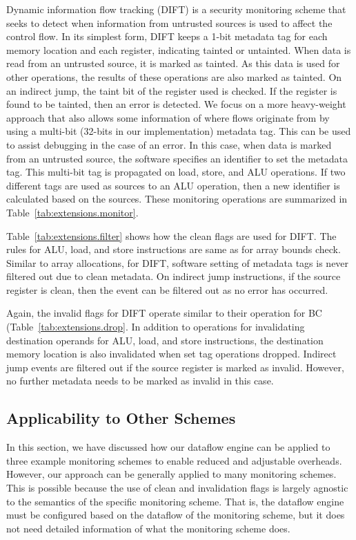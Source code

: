 Dynamic information flow tracking (DIFT) \cite{dift-asplos04} is a security
monitoring scheme that seeks to detect when information from untrusted sources
is used to affect the control flow.  In its simplest form, DIFT keeps a 1-bit
metadata tag for each memory location and each register, indicating tainted or
untainted. When data is read from an untrusted source, it is marked as tainted.
As this data is used for other operations, the results of these operations are
also marked as tainted. On an indirect jump, the taint bit of the register used
is checked. If the register is found to be tainted, then an error is detected.
We focus on a more heavy-weight approach that also allows some information of
where flows originate from by using a multi-bit (32-bits in our implementation)
metadata tag. This can be used to assist debugging in the case of an error. In
this case, when data is marked from an untrusted source, the software specifies
an identifier to set the metadata tag. This multi-bit tag is propagated on
load, store, and ALU operations. If two different tags are used as sources to
an ALU operation, then a new identifier is calculated based on the sources.
These monitoring operations are summarized in
Table~\ref{tab:extensions.monitor}.

Table~\ref{tab:extensions.filter} shows how the clean flags are used for DIFT.
The rules for ALU, load, and store instructions are same as for array bounds
check. Similar to array allocations, for DIFT, software setting of metadata
tags is never filtered out due to clean metadata. On indirect jump
instructions, if the source register is clean, then the event can be filtered
out as no error has occurred.

Again, the invalid flags for DIFT operate similar to their operation for BC
(Table~\ref{tab:extensions.drop}. In addition to operations for invalidating
destination operands for ALU, load, and store instructions, the destination
memory location is also invalidated when set tag operations dropped. Indirect
jump events are filtered out if the source register is marked as invalid.
However, no further metadata needs to be marked as invalid in this case.

\subsection{Applicability to Other Schemes}

In this section, we have discussed how our dataflow engine can be applied to
three example monitoring schemes to enable reduced and adjustable overheads.
However, our approach can be generally applied to many monitoring schemes. This
is possible because the use of clean and invalidation flags is largely agnostic
to the semantics of the specific monitoring scheme. That is, the dataflow
engine must be configured based on the dataflow of the monitoring scheme, but
it does not need detailed information of what the monitoring scheme does. 

